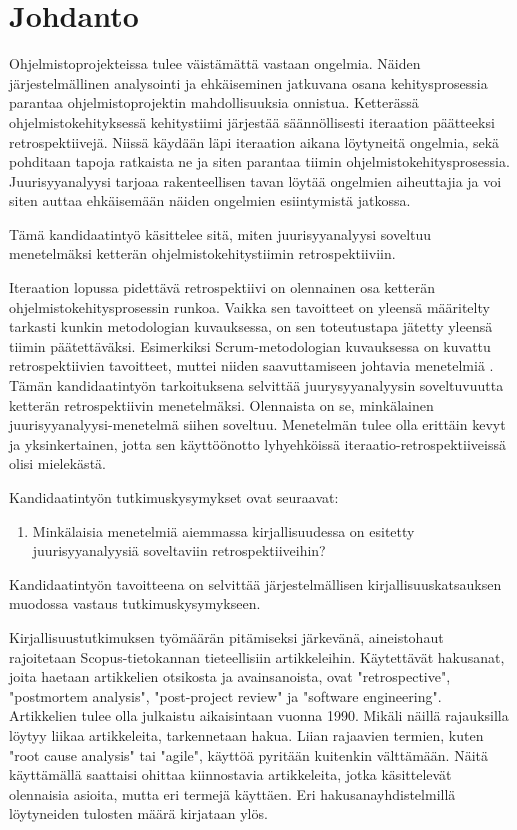 
\section{Johdanto}

Ohjelmistoprojekteissa tulee väistämättä vastaan ongelmia. Näiden järjestelmällinen analysointi ja ehkäiseminen jatkuvana osana kehitysprosessia parantaa ohjelmistoprojektin mahdollisuuksia onnistua. Ketterässä ohjelmistokehityksessä kehitystiimi järjestää säännöllisesti iteraation päätteeksi retrospektiivejä. Niissä käydään läpi iteraation aikana löytyneitä ongelmia, sekä pohditaan tapoja ratkaista ne ja siten parantaa tiimin ohjelmistokehitysprosessia. Juurisyyanalyysi tarjoaa rakenteellisen tavan löytää ongelmien aiheuttajia ja voi siten auttaa ehkäisemään näiden ongelmien esiintymistä jatkossa.

Tämä kandidaatintyö käsittelee sitä, miten juurisyyanalyysi soveltuu menetelmäksi ketterän ohjelmistokehitystiimin retrospektiiviin.

Iteraation lopussa pidettävä retrospektiivi on olennainen osa ketterän ohjelmistokehitysprosessin runkoa. Vaikka sen tavoitteet on yleensä määritelty tarkasti kunkin metodologian kuvauksessa, on sen toteutustapa jätetty yleensä tiimin päätettäväksi. Esimerkiksi Scrum-metodologian kuvauksessa on kuvattu retrospektiivien tavoitteet, muttei niiden saavuttamiseen johtavia menetelmiä \citep{ScrumGuide2011}. Tämän kandidaatintyön tarkoituksena selvittää juurysyyanalyysin soveltuvuutta ketterän retrospektiivin menetelmäksi. Olennaista on se, minkälainen juurisyyanalyysi-menetelmä siihen soveltuu. Menetelmän tulee olla erittäin kevyt ja yksinkertainen, jotta sen käyttöönotto lyhyehköissä iteraatio-retrospektiiveissä olisi mielekästä.

Kandidaatintyön tutkimuskysymykset ovat seuraavat:
\begin{enumerate}
\item Minkälaisia menetelmiä aiemmassa kirjallisuudessa on esitetty juurisyyanalyysiä soveltaviin retrospektiiveihin?
\end{enumerate}

Kandidaatintyön tavoitteena on selvittää järjestelmällisen kirjallisuuskatsauksen \citep{Kitchenham2010} muodossa vastaus tutkimuskysymykseen.

Kirjallisuustutkimuksen työmäärän pitämiseksi järkevänä, aineistohaut rajoitetaan Scopus-tietokannan tieteellisiin artikkeleihin. Käytettävät hakusanat, joita haetaan artikkelien otsikosta ja avainsanoista, ovat "retrospective", "postmortem analysis", "post-project review" ja "software engineering". Artikkelien tulee olla julkaistu aikaisintaan vuonna 1990. Mikäli näillä rajauksilla löytyy liikaa artikkeleita, tarkennetaan hakua. Liian rajaavien termien, kuten "root cause analysis" tai "agile", käyttöä pyritään kuitenkin välttämään. Näitä käyttämällä saattaisi ohittaa kiinnostavia artikkeleita, jotka käsittelevät olennaisia asioita, mutta eri termejä käyttäen. Eri hakusanayhdistelmillä löytyneiden tulosten määrä kirjataan ylös.

